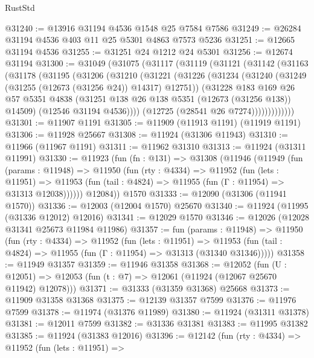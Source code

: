 \begin{lexlean}{RustStd}
\begin{coremodule}
{\begin{coremodule}
{{{{{{{{{{{{{{{{{{{{{{{{{{{{{{{{{{{{{{{{{{{{{{{{{{{{{{{{{{{{{{{{{{{{{{{{{{{{{{{{@31240 := @13916 @31194 @4536 @1548 @25 @7584 @7586
@31249 := @26284 @31194 @4536 @403 @11 @25 @5301 @4863 @7573 @5236
@31251 := @12665 @31194 @4536
@31255 := @31251 @24 @1212 @24 @5301
@31256 := @12674 @31194
@31300 := @31049
    (@31075
      (@31117
        (@31119
          (@31121
            (@31142
              (@31163
                (@31178
                  (@31195
                    (@31206
                      (@31210
                        (@31221
                          (@31226
                            (@31234
                              (@31240 (@31249 (@31255 (@12673 (@31256 @24)) @14317) @12751))
                              (@31228
                                @183
                                @169
                                @26
                                @57
                                @5351
                                @4838
                                (@31251 @138 @26 @138 @5351 (@12673 (@31256 @138)) @14509)
                                (@12546 @31194 @4536))))
                          (@12725 (@28541 @26 @7274)))))))))))))
@31301 := @11907 @1191
@31305 := @11909 (@11913 @1191) (@11919 @1191)
@31306 := @11928 @25667
@31308 := @11924 (@31306 @11943)
@31310 := @11966 (@11967 @1191)
@31311 := @11962 @31310
@31313 := @11924 (@31311 @11991)
@31330 := @11923
    (fun (fn : @131) =>
    @31308
      (@11946
        (@11949
          (fun (params : @11948) =>
          @11950
            (fun (rty : @4334) =>
            @11952
              (fun (lets : @11951) =>
              @11953 (fun (tail : @4824) => @11955 (fun (Γ : @11954) => @31313 @12038))))))
        @12084))
    @1570
@31333 := @12090 (@31306 (@11941 @1570))
@31336 := @12003 (@12004 @1570) @25670
@31340 := @11924 (@11995 (@31336 @12012) @12016)
@31341 := @12029 @1570
@31346 := @12026 (@12028 @31341 @25673 @11984 @11986)
@31357 := fun (params : @11948) =>
  @11950
    (fun (rty : @4334) =>
    @11952
      (fun (lets : @11951) =>
      @11953 (fun (tail : @4824) => @11955 (fun (Γ : @11954) => @31313 (@31340 @31346)))))
@31358 := @11949 @31357
@31359 := @11946 @31358
@31368 := @12052
    (fun (U : @12051) => @12053 (fun (t : @7) => @12061 (@11924 (@12067 @25670 @11942) @12078)))
@31371 := @31333 (@31359 @31368) @25668
@31373 := @11909 @31358 @31368
@31375 := @12139 @31357 @7599
@31376 := @11976 @7599
@31378 := @11974 (@31376 @11989)
@31380 := @11924 (@31311 @31378)
@31381 := @12011 @7599
@31382 := @31336 @31381
@31383 := @11995 @31382
@31385 := @11924 (@31383 @12016)
@31396 := @12142
    (fun (rty : @4334) =>
    @11952
      (fun (lets : @11951) =>
}}}}}}}}}}}}}}}}}}}}}}}}}}}}}}}}}}}}}}}}}}}}}}}}}}}}}}}}}}}}}}}}}}}}}}}}}}}}}}}}
\end{coremodule}}
\end{coremodule}
\end{lexlean}

